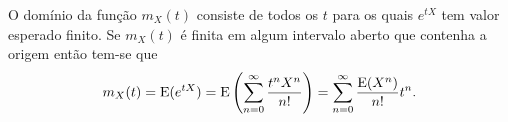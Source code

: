 \begin{frame}
	
	
	
	
	
	
	
	
	
	
	
	
	
	
	
	
	
	O domínio da função $m_{X}(t)$ consiste de todos os $t$ para os quais
	$e^{tX}$ tem valor esperado finito. Se $m_{X}(t)$ é finita em algum intervalo aberto que
	contenha a origem então tem-se que 
	\begin{equation}
	\label{mo1}
	m_{X}(t)={\rm E}(e^{tX})={\rm E}\left(\sum_{n=0}^{\infty }\frac{t^{n}X^{n}}{n!}%
	\right)=\sum_{n=0}^{\infty }\frac{{\rm E}(X^{n})}{n!}t^{n}.
	\end{equation}
\end{frame}

